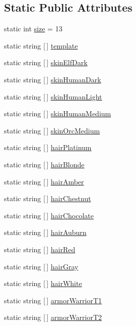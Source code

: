 \subsection*{Static Public Attributes}
\begin{DoxyCompactItemize}
\item 
static int \mbox{\hyperlink{class_swatch_add44bcf99941068a9fa8bd714b9f9e1f}{size}} = 13
\item 
static string \mbox{[}$\,$\mbox{]} \mbox{\hyperlink{class_swatch_a3008c0c1ec9d9854a19db69ab50fa3f7}{template}}
\item 
static string \mbox{[}$\,$\mbox{]} \mbox{\hyperlink{class_swatch_a4edd7ea34f074131f71220de5989da08}{skin\+Elf\+Dark}}
\item 
static string \mbox{[}$\,$\mbox{]} \mbox{\hyperlink{class_swatch_a011a5ec7c2625be7bd8242dd650861bd}{skin\+Human\+Dark}}
\item 
static string \mbox{[}$\,$\mbox{]} \mbox{\hyperlink{class_swatch_af50003b54151794209bffdb01e919634}{skin\+Human\+Light}}
\item 
static string \mbox{[}$\,$\mbox{]} \mbox{\hyperlink{class_swatch_a768845d142f84d1b8e11b89f60b3046c}{skin\+Human\+Medium}}
\item 
static string \mbox{[}$\,$\mbox{]} \mbox{\hyperlink{class_swatch_a0b42dec064738e6d09e2042872ca7059}{skin\+Orc\+Medium}}
\item 
static string \mbox{[}$\,$\mbox{]} \mbox{\hyperlink{class_swatch_aab6e6b044f591841d67e2e9c40a95681}{hair\+Platinum}}
\item 
static string \mbox{[}$\,$\mbox{]} \mbox{\hyperlink{class_swatch_a17d4d5820f120cf74a8e95f4cc4bd352}{hair\+Blonde}}
\item 
static string \mbox{[}$\,$\mbox{]} \mbox{\hyperlink{class_swatch_a17ef52dbfcba9d90906e6b1ecc4fe558}{hair\+Amber}}
\item 
static string \mbox{[}$\,$\mbox{]} \mbox{\hyperlink{class_swatch_aacb022b601c4257fa0990020ed041378}{hair\+Chestnut}}
\item 
static string \mbox{[}$\,$\mbox{]} \mbox{\hyperlink{class_swatch_a48c6ebadeb847238247c01964e9ced1d}{hair\+Chocolate}}
\item 
static string \mbox{[}$\,$\mbox{]} \mbox{\hyperlink{class_swatch_aeb527e9ddf422537a7efc0448820e31c}{hair\+Auburn}}
\item 
static string \mbox{[}$\,$\mbox{]} \mbox{\hyperlink{class_swatch_a1c0c7581bb1a37878ca2dc9e2c0c874d}{hair\+Red}}
\item 
static string \mbox{[}$\,$\mbox{]} \mbox{\hyperlink{class_swatch_ac0e119119c07b48303e4ef6d906a0dd3}{hair\+Gray}}
\item 
static string \mbox{[}$\,$\mbox{]} \mbox{\hyperlink{class_swatch_ae3225b59ee4e0c86882b08b60341ca2d}{hair\+White}}
\item 
static string \mbox{[}$\,$\mbox{]} \mbox{\hyperlink{class_swatch_a5ccacbc7ececef94419afabec7499547}{armor\+Warrior\+T1}}
\item 
static string \mbox{[}$\,$\mbox{]} \mbox{\hyperlink{class_swatch_a0c5ed8cbff8b6f36a6abfa9be78e397f}{armor\+Warrior\+T2}}
\end{DoxyCompactItemize}


